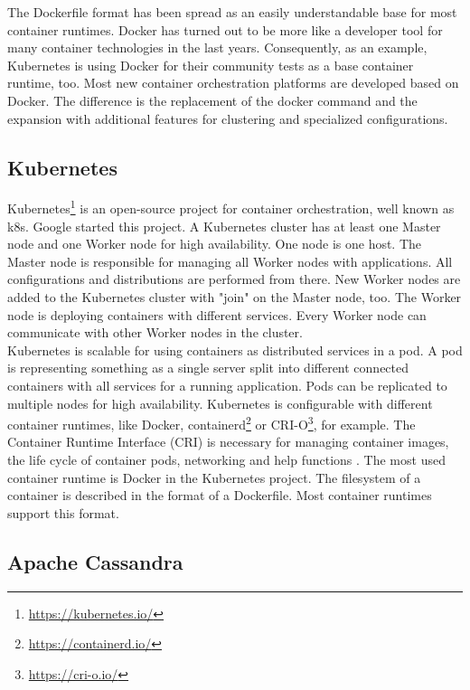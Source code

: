 The Dockerfile format has been spread as an easily understandable base for most container runtimes. 
Docker has turned out to be more like a developer tool for many container technologies in the last years. 
Consequently, as an example, Kubernetes is using Docker for their community tests as a base container runtime, too.
Most new container orchestration platforms are developed based on Docker. The difference is the replacement of the docker command and the expansion with additional features for clustering and specialized configurations.

\subsection{Kubernetes}

Kubernetes\footnote{\url{https://kubernetes.io/}} is an open-source project for container orchestration, well known as k8s. Google started this project. A Kubernetes cluster has at least one Master node and one Worker node for high availability. One node is one host. The Master node is responsible for managing all Worker nodes with applications. All configurations and distributions are performed from there. New Worker nodes are added to the Kubernetes cluster with "join" on the Master node, too. The Worker node is deploying containers with different services. Every Worker node can communicate with other Worker nodes in the cluster. \\
Kubernetes is scalable for using containers as distributed services in a pod. A pod is representing something as a single server split into different connected containers with all services for a running application. Pods can be replicated to multiple nodes for high availability. Kubernetes is configurable with different container runtimes, like Docker, containerd\footnote{\url{https://containerd.io/}} or CRI-O\footnote{\url{https://cri-o.io/}}, for example. The Container Runtime Interface (CRI) is necessary for managing container images, the life cycle of container pods, networking and help functions \cite[~p.16]{Scholl2019}. The most used container runtime is Docker in the Kubernetes project. The filesystem of a container is described in the format of a Dockerfile. Most container runtimes support this format.


\subsection{Apache Cassandra}

